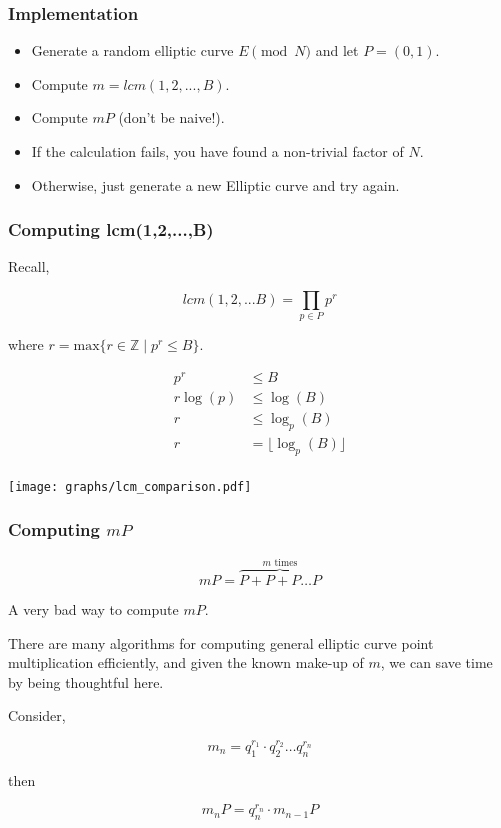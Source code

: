 \documentclass{beamer}
\begin{document}
\begin{frame}
\frametitle{Implementation}

\begin{itemize}
    \item Generate a random elliptic curve $E \pmod{N}$ and let $P = (0,1)$.
    \item Compute $m = lcm(1,2,...,B)$.
    \item Compute $mP$ (don't be naive!).
    \item If the calculation fails, you have found a non-trivial factor of $N$.
    \item Otherwise, just generate a new Elliptic curve and try again.
\end{itemize}

\end{frame}

\begin{frame}
\frametitle{Computing lcm(1,2,...,B)}

Recall,

\[ lcm(1,2,...B) = \prod_{p \in P} p^r \]

where $r = \text{max} \{ r \in \mathbb{Z} \mid p^r \leq B \}$.

\begin{align*}
    p^r &\leq B \\
    r\log(p) &\leq \log(B) \\
    r &\leq \log_p(B) \\
    r &= \lfloor \log_p(B) \rfloor \\
\end{align*}

\end{frame}

\begin{frame}

\texttt{[image: graphs/lcm\_comparison.pdf]}

\end{frame}

\begin{frame}
\frametitle{Computing $mP$}

\[ mP = \overbrace{P + P + P \ldots P}^\text{$m$ times} \]
\begin{center}
    A very bad way to compute $mP$.
\end{center}

There are many algorithms for computing general elliptic curve point
multiplication efficiently, and given the known make-up of $m$, we can
save time by being thoughtful here.

Consider,

\[ m_n = q_1^{r_1} \cdot q_2^{r_2} \ldots q_n^{r_n} \]

then

\[ m_nP = q_n^{r_n} \cdot m_{n-1}P \]

\end{frame}
\end{document}
